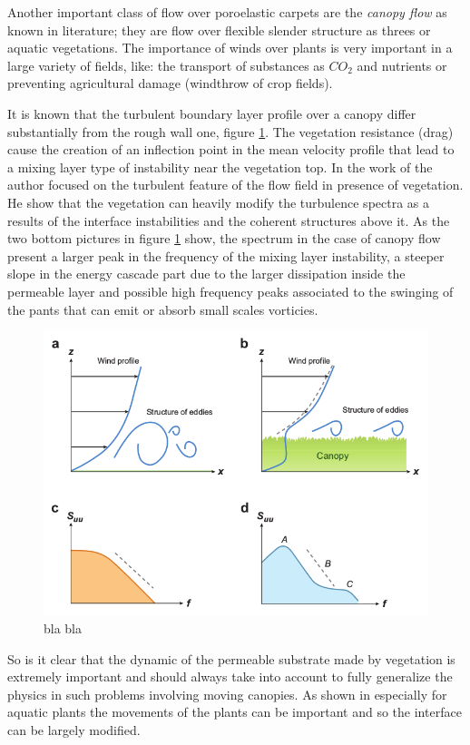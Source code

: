 Another important class of flow over poroelastic carpets are the \textit{canopy flow} as known in literature; they are flow over flexible slender structure as threes or aquatic vegetations.
The importance of winds over plants is very important in a large variety of fields, like: the transport of substances as $CO_2$ and nutrients or preventing agricultural damage (windthrow of crop fields).

It is known that the turbulent boundary layer profile over a canopy differ substantially from the rough wall one, figure \ref{fig:spectra}.
The vegetation resistance (drag) cause the creation of an inflection point in the mean velocity profile that lead to a mixing layer type of instability near the vegetation top.
In the work of \citet{finnigan2000turbulence} the author focused on the turbulent feature of the flow field in presence of vegetation.
He show that the vegetation can heavily modify the turbulence spectra as a results of the interface instabilities and the coherent structures above it.
As the two bottom pictures in figure \ref{fig:spectra} show, the spectrum in the case of canopy flow present a larger peak in the frequency of the mixing layer instability, a steeper slope in the energy cascade part due to the larger dissipation inside the permeable layer and possible high frequency peaks associated to the swinging of the pants that can emit or absorb small scales vorticies.
 
\begin{figure}[h]
	\centering
	\includegraphics[width=0.7\linewidth]{chapter_1/spectra}
	\caption{bla bla \citet{de2008effects}}
		\label{fig:spectra}
	\end{figure}

So is it clear that the dynamic of the permeable substrate made by vegetation is extremely important and should always take into account to fully generalize the physics in such problems involving moving canopies.
As shown in \citet{nepf2012flow} especially for aquatic plants the movements of the plants can be important and so the interface can be largely modified.

